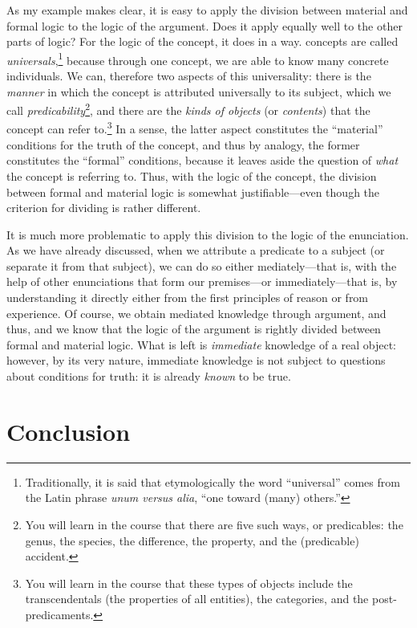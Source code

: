 \documentclass[
  12pt,
]{memoir}
\begin{document}
As my example makes clear, it is easy to apply the division between
material and formal logic to the logic of the argument. Does it apply
equally well to the other parts of logic? For the logic of the concept,
it does in a way. concepts are called \emph{universals},\footnote{Traditionally,
  it is said that etymologically the word ``universal'' comes from the
  Latin phrase \emph{unum versus alia}, ``one toward (many) others.''}
because through one concept, we are able to know many concrete
individuals. We can, therefore two aspects of this universality: there
is the \emph{manner} in which the concept is attributed universally to
its subject, which we call \emph{predicability}\footnote{You will learn
  in the course that there are five such ways, or predicables: the
  genus, the species, the difference, the property, and the (predicable)
  accident.}, and there are the \emph{kinds of objects} (or
\emph{contents}) that the concept can refer to.\footnote{You will learn
  in the course that these types of objects include the transcendentals
  (the properties of all entities), the categories, and the
  post-predicaments.} In a sense, the latter aspect constitutes the
``material'' conditions for the truth of the concept, and thus by
analogy, the former constitutes the ``formal'' conditions, because it
leaves aside the question of \emph{what} the concept is referring to.
Thus, with the logic of the concept, the division between formal and
material logic is somewhat justifiable---even though the criterion for
dividing is rather different.

It is much more problematic to apply this division to the logic of the
enunciation. As we have already discussed, when we attribute a predicate
to a subject (or separate it from that subject), we can do so either
mediately---that is, with the help of other enunciations that form our
premises---or immediately---that is, by understanding it directly either
from the first principles of reason or from experience. Of course, we
obtain mediated knowledge through argument, and thus, and we know that
the logic of the argument is rightly divided between formal and material
logic. What is left is \emph{immediate} knowledge of a real object:
however, by its very nature, immediate knowledge is not subject to
questions about conditions for truth: it is already \emph{known} to be
true.

\chapter*{Conclusion}\label{conclusion}
\end{document}
